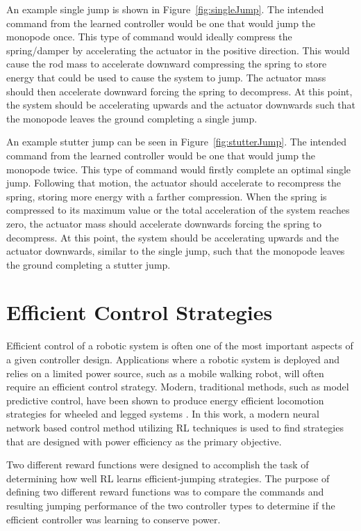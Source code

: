 An example single jump is shown in Figure~\ref{fig:singleJump}. The intended command from the learned controller would be one that would jump the monopode once. This type of command would ideally compress the spring/damper by accelerating the actuator in the positive direction. This would cause the rod mass to accelerate downward compressing the spring to store energy that could be used to cause the system to jump. The actuator mass should then accelerate downward forcing the spring to decompress. At this point, the system should be accelerating upwards and the actuator downwards such that the monopode leaves the ground completing a single jump. 

An example stutter jump can be seen in Figure~\ref{fig:stutterJump}. The intended command from the learned controller would be one that would jump the monopode twice. This type of command would firstly complete an optimal single jump. Following that motion, the actuator should accelerate to recompress the spring, storing more energy with a farther compression. When the spring is compressed to its maximum value or the total acceleration of the system reaches zero, the actuator mass should accelerate downwards forcing the spring to decompress. At this point, the system should be accelerating upwards and the actuator downwards, similar to the single jump, such that the monopode leaves the ground completing a stutter jump.

\section{Efficient Control Strategies}
% 
Efficient control of a robotic system is often one of the most important aspects of a given controller design. Applications where a robotic system is deployed and relies on a limited power source, such as a mobile walking robot, will often require an efficient control strategy. Modern, traditional methods, such as model predictive control, have been shown to produce energy efficient locomotion strategies for wheeled and legged systems \cite{Harper2019, Pace2017}. In this work, a modern neural network based control method utilizing RL techniques is used to find strategies that are designed with power efficiency as the primary objective.

Two different reward functions were designed to accomplish the task of determining how well RL learns efficient-jumping strategies. The purpose of defining two different reward functions was to compare the commands and resulting jumping performance of the two controller types to determine if the efficient controller was learning to conserve power. 

